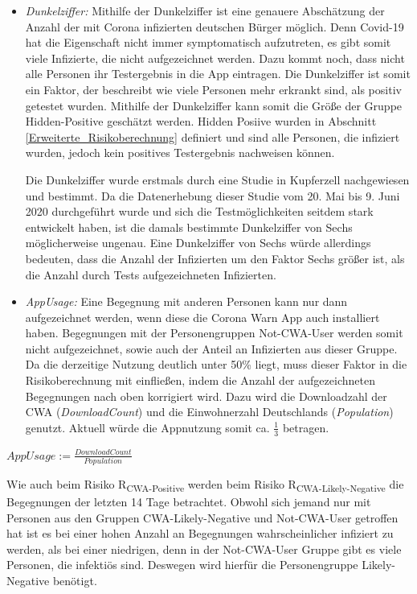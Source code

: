 \documentclass[conference,compsoc]{IEEEtran}
\begin{document}
\begin{itemize}
	\item \textit{Dunkelziffer:} Mithilfe der Dunkelziffer ist eine genauere Abschätzung der Anzahl der mit Corona infizierten deutschen Bürger möglich. 
	Denn Covid-19 hat die Eigenschaft nicht immer symptomatisch aufzutreten, es gibt somit viele Infizierte, 
	die nicht aufgezeichnet werden. Dazu kommt noch, dass nicht alle Personen ihr Testergebnis in die App eintragen.
	Die Dunkelziffer ist somit  ein Faktor, der beschreibt wie viele Personen mehr erkrankt sind, 
	als positiv getestet wurden. Mithilfe der Dunkelziffer kann somit die Größe der Gruppe Hidden-Positive geschätzt werden.
	Hidden Posiive wurden in Abschnitt \ref{Erweiterte_Risikoberechnung} definiert und sind alle Personen, die infiziert wurden, jedoch kein positives Testergebnis nachweisen können. 

	Die Dunkelziffer wurde erstmals durch eine Studie in Kupferzell \cite{Dunkelziffer} nachgewiesen und bestimmt. 
	Da die Datenerhebung dieser Studie vom 20. Mai bis 9. Juni 2020 durchgeführt wurde und sich die Testmöglichkeiten seitdem stark entwickelt haben, 
	ist die damals bestimmte Dunkelziffer von Sechs möglicherweise ungenau. 
	Eine Dunkelziffer von Sechs würde allerdings bedeuten, dass die Anzahl der Infizierten um den Faktor Sechs größer ist, 
	als die Anzahl durch Tests aufgezeichneten Infizierten.
	\item \textit{AppUsage:} Eine Begegnung mit anderen Personen kann nur dann aufgezeichnet werden, wenn diese die Corona Warn App auch installiert haben. 
	Begegnungen mit der Personengruppen Not-CWA-User werden somit nicht aufgezeichnet, sowie auch der Anteil an Infizierten aus dieser Gruppe. 
	Da die derzeitige Nutzung deutlich unter 50\% liegt, muss dieser Faktor in die Risikoberechnung mit einfließen, 
	indem die Anzahl der aufgezeichneten Begegnungen nach oben korrigiert wird. 
	Dazu wird die Downloadzahl der CWA (\textit{DownloadCount}) \cite{Downloads} und die Einwohnerzahl Deutschlands (\textit{Population}) \cite{Einwohnerzahl} genutzt. 
	Aktuell würde die Appnutzung somit ca. $\frac{1}{3}$ betragen.
\end{itemize}

\centerline{\text{ }}
\centerline{$AppUsage := \frac{DownloadCount}{Population}$}
\centerline{\text{ }}

Wie auch beim Risiko R\textsubscript{CWA-Positive} werden beim Risiko R\textsubscript{CWA-Likely-Negative} die Begegnungen der letzten 14 Tage betrachtet.
Obwohl sich jemand nur mit Personen aus den Gruppen CWA-Likely-Negative und Not-CWA-User getroffen hat
ist es bei einer hohen Anzahl an Begegnungen wahrscheinlicher infiziert zu werden, als bei einer niedrigen, denn in der Not-CWA-User Gruppe gibt es viele Personen, die infektiös sind. 
Deswegen wird hierfür die Personengruppe Likely-Negative benötigt. 
\end{document}

